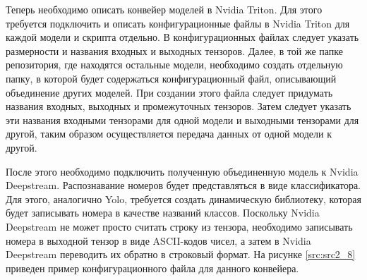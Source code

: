 


Теперь необходимо описать конвейер моделей в Nvidia Triton. Для этого требуется подключить и описать конфигурационные файлы в Nvidia Triton для каждой модели и скрипта отдельно. В конфигурационных файлах следует указать размерности и названия входных и выходных тензоров. Далее, в той же папке репозитория, где находятся остальные модели, необходимо создать отдельную папку, в которой будет содержаться конфигурационный файл, описывающий объединение других моделей. При создании этого файла следует придумать названия входных, выходных и промежуточных тензоров. Затем следует указать эти названия входными тензорами для одной модели и выходными тензорами для другой, таким образом осуществляется передача данных от одной модели к другой.

После этого необходимо подключить полученную объединенную модель к Nvidia Deepstream. Распознавание номеров будет представляться в виде классификатора. Для этого, аналогично Yolo, требуется создать динамическую библиотеку, которая будет записывать номера в качестве названий классов. Поскольку Nvidia Deepstream не может просто считать строку из тензора, необходимо записывать номера в выходной тензор в виде ASCII-кодов чисел, а затем в Nvidia Deepstream переводить их обратно в строковый формат. На рисунке \ref{src:src2_8} приведен пример конфигурационного файла для данного конвейера.

